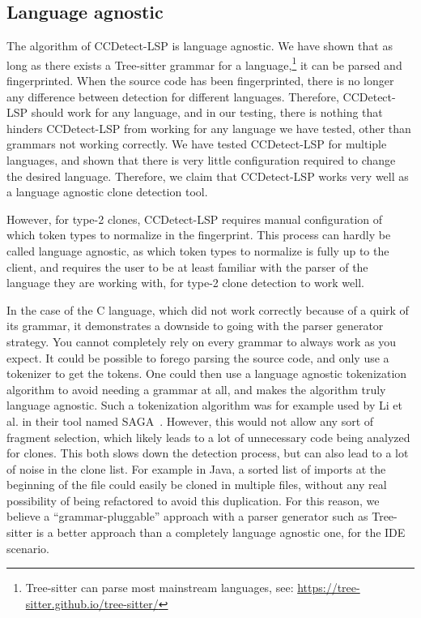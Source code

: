 \subsection*{Language agnostic}

The algorithm of CCDetect-LSP is language agnostic. We have shown that as long as there
exists a Tree-sitter grammar for a language,\footnote{Tree-sitter can parse most
mainstream languages, see: \url{https://tree-sitter.github.io/tree-sitter/}} it can be
parsed and fingerprinted. When the source code has been fingerprinted, there is no longer
any difference between detection for different languages. Therefore, CCDetect-LSP should
work for any language, and in our testing, there is nothing that hinders CCDetect-LSP from
working for any language we have tested, other than grammars not working correctly. We
have tested CCDetect-LSP for multiple languages, and shown that there is very little
configuration required to change the desired language. Therefore, we claim that
CCDetect-LSP works very well as a language agnostic clone detection tool.

However, for type-2 clones, CCDetect-LSP requires manual configuration of which token
types to normalize in the fingerprint. This process can hardly be called language
agnostic, as which token types to normalize is fully up to the client, and requires the
user to be at least familiar with the parser of the language they are working with, for
type-2 clone detection to work well.

In the case of the C language, which did not work correctly because of a quirk of its
grammar, it demonstrates a downside to going with the parser generator strategy. You
cannot completely rely on every grammar to always work as you expect. It could be possible
to forego parsing the source code, and only use a tokenizer to get the tokens. One could
then use a language agnostic tokenization algorithm to avoid needing a grammar at all, and
makes the algorithm truly language agnostic. Such a tokenization algorithm was for example
used by Li et al. in their tool named SAGA~\cite{SAGA}. However, this would not allow any
sort of fragment selection, which likely leads to a lot of unnecessary code being analyzed
for clones. This both slows down the detection process, but can also lead to a lot of
noise in the clone list. For example in Java, a sorted list of imports at the beginning of
the file could easily be cloned in multiple files, without any real possibility of being
refactored to avoid this duplication. For this reason, we believe a ``grammar-pluggable''
approach with a parser generator such as Tree-sitter is a better approach than a
completely language agnostic one, for the IDE scenario.

